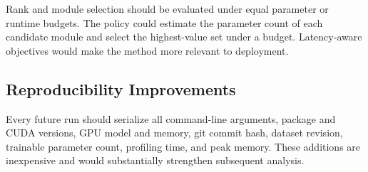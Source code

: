 Rank and module selection should be evaluated under equal parameter or runtime budgets. The policy
could estimate the parameter count of each candidate module and select the highest-value set under
a budget. Latency-aware objectives would make the method more relevant to deployment.

\subsection{Reproducibility Improvements}

Every future run should serialize all command-line arguments, package and CUDA versions, GPU model
and memory, git commit hash, dataset revision, trainable parameter count, profiling time, and peak
memory. These additions are inexpensive and would substantially strengthen subsequent analysis.
